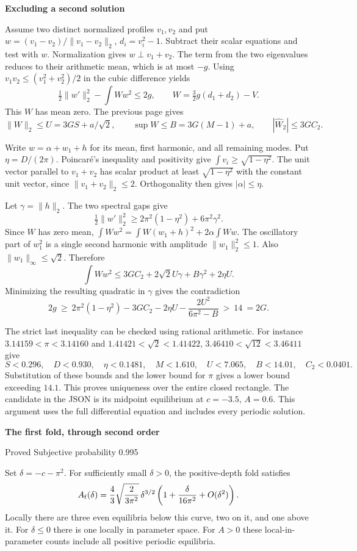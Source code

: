 \documentclass[11pt]{article}
\newcommand{\titleline}[1]{{\Large\bfseries\sffamily\color{ink}#1}\par}
\newcommand{\topic}[1]{\smallskip{\bfseries\sffamily\color{accent}#1}\par\nobreak}
\newcommand{\norm}[1]{\lVert #1\rVert}
\newcommand{\prob}[1]{{\small\sffamily\color{accent}#1}\par}
\begin{document}
\newpage
\titleline{Excluding a second solution}
Assume two distinct normalized profiles $v_1,v_2$ and put
$w=(v_1-v_2)/\norm{v_1-v_2}_2$, $d_i=v_i^2-1$.
Subtract their scalar equations and test with $w$. Normalization gives
$w\perp v_1+v_2$. The term from the two eigenvalues reduces to their arithmetic mean, which is at most $-g$. Using $v_1 v_2\le(v_1^2+v_2^2)/2$ in the cubic difference yields
\[
\tfrac12\norm{w'}_2^2-\int Ww^2\le2g,\qquad
W=\tfrac32g(d_1+d_2)-V.
\]
This $W$ has mean zero. The previous page gives
\[
\norm W_2\le U=3GS+a/\sqrt2,\qquad
\sup W\le B=3G(M-1)+a,\qquad |\widehat W_2|\le3G C_2 .
\]

Write $w=\alpha+w_1+h$ for its mean, first harmonic, and all remaining modes. Put $\eta=D/(2\pi)$. Poincaré's inequality and positivity give $\int v_i\ge\sqrt{1-\eta^2}$. The unit vector parallel to $v_1+v_2$ has scalar product at least $\sqrt{1-\eta^2}$ with the constant unit vector, since $\norm{v_1+v_2}_2\le2$. Orthogonality then gives $|\alpha|\le\eta$.

Let $\gamma=\norm h_2$. The two spectral gaps give
\[
\tfrac12\norm{w'}_2^2\ge 2\pi^2(1-\eta^2)+6\pi^2\gamma^2 .
\]
Since $W$ has zero mean, $\int Ww^2=\int W(w_1+h)^2+2\alpha\int Ww$.
The oscillatory part of $w_1^2$ is a single second harmonic with amplitude $\norm{w_1}_2^2\le1$. Also $\norm{w_1}_\infty\le\sqrt2$. Therefore
\[
\int Ww^2\le 3G C_2+2\sqrt2 U\gamma+B\gamma^2+2\eta U .
\]
Minimizing the resulting quadratic in $\gamma$ gives the contradiction
\[
2g\ \ge\ 2\pi^2(1-\eta^2)-3G C_2-2\eta U-\frac{2U^2}{6\pi^2-B}\ >\ 14\ =2G .
\]

\topic{Finite numerical inequality in the proof}
The strict last inequality can be checked using rational arithmetic. For instance $3.14159<\pi<3.14160$ and $1.41421<\sqrt2<1.41422$, $3.46410<\sqrt{12}<3.46411$ give
\[
 S<0.296,\quad D<0.930,\quad \eta<0.1481,\quad
 M<1.610,\quad U<7.065,\quad B<14.01,\quad C_2<0.0401 .
\]
Substitution of these bounds and the lower bound for $\pi$ gives a lower bound exceeding $14.1$. This proves uniqueness over the entire closed rectangle. The candidate in the JSON is its midpoint equilibrium at $c=-3.5$, $A=0.6$. This argument uses the full differential equation and includes every periodic solution.

\newpage
\titleline{The first fold, through second order}
\prob{Proved \quad Subjective probability 0.995}
Set $\delta=-c-\pi^2$. For sufficiently small $\delta>0$, the positive-depth fold satisfies
\[
 A_{\rm f}(\delta)=\frac43\sqrt{\frac{2}{3\pi^2}}\,\delta^{3/2}
 \left(1+\frac{\delta}{16\pi^2}+O(\delta^2)\right).
\]
Locally there are three even equilibria below this curve, two on it, and one above it. For $\delta\le0$ there is one locally in parameter space. For $A>0$ these local-in-parameter counts include all positive periodic equilibria.
\end{document}
